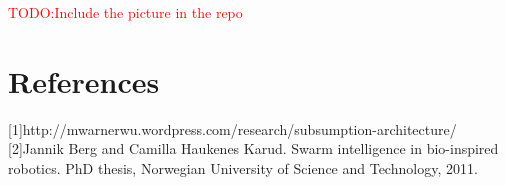 \documentclass[a4paper]{article}
\newcommand\TODO[1]{\textcolor{red}{TODO:#1}}
\newcommand\todo[1]{\TODO{#1}}
\begin{document}



\newpage
\todo{Include the picture in the repo}


\newpage
\part{References}
[1]http://mwarnerwu.wordpress.com/research/subsumption-architecture/
[2]Jannik Berg and Camilla Haukenes Karud. Swarm intelligence in bio-inspired robotics. PhD thesis,
Norwegian University of Science and Technology, 2011.



\nocite{*}
\end{document}
